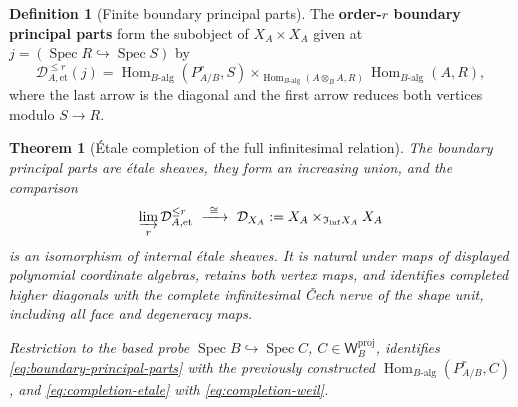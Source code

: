\documentclass[11pt,a4paper]{article}
\numberwithin{algorithm}{section}
\numberwithin{equation}{section}
\newtheorem{theorem}{Theorem}[section]
\theoremstyle{definition}
\newtheorem{definition}[definition]{Definition}
\theoremstyle{remark}
\theoremstyle{plain}
\newcommand{\Hom}{\operatorname{Hom}}
\newcommand{\Weil}{\mathsf W}
\newcommand{\InfShape}{\mathfrak I_{\mathrm{inf}}}
\theoremstyle{definition}
\theoremstyle{plain}
\begin{document}
\begin{definition}[Finite boundary principal parts]\label{def:boundary-principal-parts}
The \textbf{order-$r$ boundary principal parts} form the subobject
of $X_A\times X_A$ given at
$j=(\operatorname{Spec}R\hookrightarrow\operatorname{Spec}S)$ by
\begin{equation}\label{eq:boundary-principal-parts}
 \mathcal D_{A,\mathrm{et}}^{\le r}(j)
 =\Hom_{B\text{-alg}}(P^r_{A/B},S)
  \mathop{\times}_{\Hom_{B\text{-alg}}(A\otimes_BA,R)}
      \Hom_{B\text{-alg}}(A,R),
\end{equation}
where the last arrow is the diagonal and the first arrow
reduces both vertices modulo $S\to R$.
\end{definition}

\begin{theorem}[\'Etale completion of the full infinitesimal relation]
\label{thm:completion-etale}
The boundary principal parts are \'etale sheaves, they form
an increasing union, and the comparison
\begin{equation}\label{eq:completion-etale}
 \varinjlim_r\mathcal D_{A,\mathrm{et}}^{\le r}
 \ \xrightarrow{\ \cong\ }\
 \mathcal D_{X_A}:=
 X_A\times_{\InfShape X_A}X_A
\end{equation}
is an isomorphism of internal \'etale sheaves.  It is natural
under maps of displayed polynomial coordinate algebras,
retains both vertex maps, and identifies completed higher
diagonals with the complete infinitesimal \v{C}ech nerve of
the shape unit, including all face and degeneracy maps.

Restriction to the based probe
$\operatorname{Spec}B\hookrightarrow\operatorname{Spec}C$,
$C\in\Weil_B^{\mathrm{proj}}$, identifies
\eqref{eq:boundary-principal-parts} with the previously
constructed $\Hom_{B\text{-alg}}(P^r_{A/B},C)$, and
\eqref{eq:completion-etale} with \eqref{eq:completion-weil}.
\end{theorem}
\end{document}

